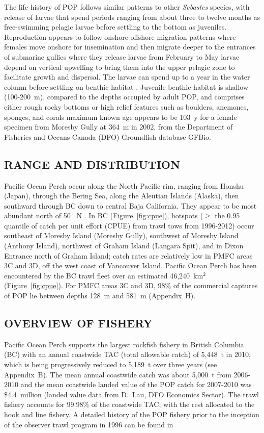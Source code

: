 The life history of POP follows similar patterns to other \emph{Sebastes} species, with release of larvae that spend periods ranging from about three to twelve months as free-swimming pelagic larvae before settling to the bottom as juveniles. Reproduction appears to follow onshore-offshore migration patterns where females move onshore for insemination and then migrate deeper to the entrances of submarine gullies where they release larvae from February to May  larvae depend on vertical upwelling to bring them into the upper pelagic zone to facilitate growth and dispersal. The larvae can spend up to a year in the water column before settling on benthic habitat . Juvenile benthic habitat is shallow (100-200~m), compared to the depths occupied by adult POP, and comprises either rough rocky bottoms or high relief features such as boulders, anemones, sponges, and corals  maximum known age appears to be 103~y for a female specimen from Moresby Gully at 364~m in 2002, from the Department of Fisheries and Oceans Canada (DFO) Groundfish database GFBio.

\subsection{RANGE AND DISTRIBUTION}

Pacific Ocean Perch occur along the North Pacific rim, ranging from Honshu (Japan), through the Bering Sea, along the Aleutian Islands (Alaska), then southward through BC down to central Baja California. They appear to be most abundant north of 50$^\circ$~N . In BC (Figure~\ref{fig:cpue}), hotspots ($\geq$ the 0.95 quantile of catch per unit effort (CPUE) from trawl tows from 1996-2012) occur southeast of Moresby Island (Moresby Gully), southwest of Moresby Island (Anthony Island), northwest of Graham Island (Langara Spit), and in Dixon Entrance north of Graham Island; catch rates are relatively low in PMFC areas 3C and 3D, off the west coast of Vancouver Island. Pacific Ocean Perch has been encountered by the BC trawl fleet over an estimated 46,240~km$^2$ (Figure~\ref{fig:cpue}). For PMFC areas 3C and 3D, 98\% of the commercial captures of POP lie between depths 128~m and 581~m (Appendix~H).

\subsection{OVERVIEW OF FISHERY}

Pacific Ocean Perch supports the largest rockfish fishery in British Columbia (BC) with an annual coastwide TAC (total allowable catch) of 5,448~t in 2010, which is being progressively reduced to 5,189~t over three years (see Appendix~B). The mean annual coastwide catch was about 5,000~t from 2006-2010 and the mean coastwide landed value of the POP catch for 2007-2010 was \$4.4~million (landed value data from D.~Lau, DFO Economics Sector). The trawl fishery accounts for 99.98\% of the coastwide TAC, with the rest allocated to the hook and line fishery. A detailed history of the POP fishery prior to the inception of the observer trawl program in 1996 can be found in  

